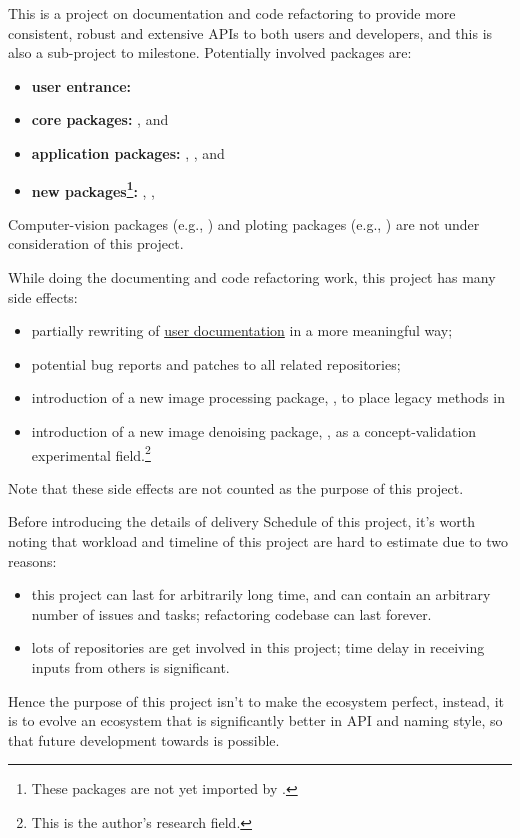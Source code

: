 This is a project on documentation and code refactoring to provide more consistent, robust and extensive APIs to both users and developers, and this is also a sub-project to \images{}  milestone. Potentially involved packages are:
\begin{itemize}
    \item \textbf{user entrance:} \repoimages
    \item \textbf{core packages:} \repoimagecore, \repoimageaxes and \repoimagemetadata
    \item \textbf{application packages:} \repoimagemorphology, \repoimagetransformations, \repoimagedistance and \repoimagefiltering
    \item \textbf{new packages\footnote{These packages are not yet imported by \images.}:} \repoimagebinarization, \repohistogramthresholding, \repoimageinpainting
\end{itemize}
Computer-vision packages (e.g., \repoimagetracking) and ploting packages (e.g., \repoimageview) are not under consideration of this project.\par

While doing the documenting and code refactoring work, this project has many side effects:
\begin{itemize}
    \item partially rewriting of \href{https://juliaimages.org}{user documentation} in a more meaningful way;
    \item potential bug reports and patches to all related \langjulia repositories;
    \item introduction of a new image processing package, , to place legacy methods in \images
    \item introduction of a new image denoising package, \repoimagenoise, as a concept-validation experimental field.\footnote{This is the author's research field.}
\end{itemize}
Note that these side effects are not counted as the purpose of this project.\par

Before introducing the details of delivery Schedule of this project, it's worth noting that workload and timeline of this project are hard to estimate due to two reasons:
\begin{itemize}
    \item this project can last for arbitrarily long time, and can contain an arbitrary number of issues and tasks; refactoring codebase can last forever.
    \item lots of repositories are get involved in this project; time delay in receiving inputs from others is significant.
\end{itemize}
Hence the purpose of this project isn't to make the ecosystem perfect, instead, it is to evolve an ecosystem that is significantly better in API and naming style, so that future development towards \images{}  is possible.
